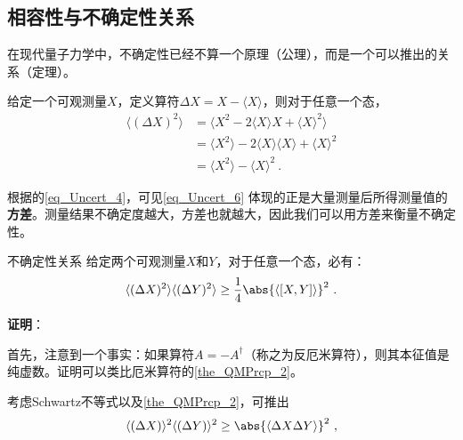 


\subsection{相容性与不确定性关系}

在现代量子力学中，不确定性已经不算一个原理（公理），而是一个可以推出的关系（定理）。

给定一个可观测量$X$，定义算符$\Delta X=X-\langle X \rangle$，则对于任意一个态，
\begin{equation}\label{eq_Uncert_6}
\begin{aligned}
\langle (\Delta X)^2 \rangle &= \langle X^2-2\langle X \rangle X + \langle X \rangle^2 \rangle\\
&=\langle X^2\rangle -2\langle X \rangle \langle X \rangle + \langle X \rangle^2\\
&=\langle X^2 \rangle - \langle X \rangle^2~.
\end{aligned}
\end{equation}

根据的\autoref{eq_Uncert_4}，可见\autoref{eq_Uncert_6} 体现的正是大量测量后所得测量值的\textbf{方差}。测量结果不确定度越大，方差也就越大，因此我们可以用方差来衡量不确定性。

\begin{theorem}{不确定性关系}\label{the_Uncert_1}
给定两个可观测量$X$和$Y$，对于任意一个态，必有：
\begin{equation}\label{eq_Uncert_9}
\langle (\Delta X)^2 \rangle\langle (\Delta Y)^2 \rangle \geq \frac{1}{4}\abs{\langle [X, Y] \rangle}^2~.
\end{equation}
\end{theorem}


\textbf{证明}：

首先，注意到一个事实：如果算符$A=-A^\dagger$（称之为反厄米算符），则其本征值是纯虚数。证明可以类比厄米算符的\autoref{the_QMPrcp_2}。

考虑Schwartz不等式以及\autoref{the_QMPrcp_2}，可推出
\begin{equation}\label{eq_Uncert_7}
\langle (\Delta X)\rangle^2\langle (\Delta Y)\rangle^2\geq \abs{\langle \Delta X \Delta Y \rangle}^2~,
\end{equation}

